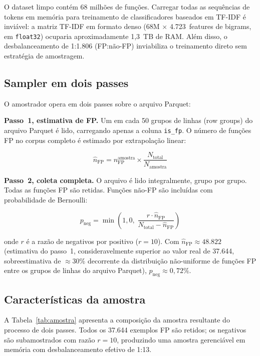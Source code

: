 O dataset limpo contém 68 milhões de funções. Carregar todas as sequências de
tokens em memória para treinamento de classificadores baseados em TF-IDF é
inviável: a matriz TF-IDF em formato denso (68M $\times$ 4.723~features de
bigrams, em \texttt{float32}) ocuparia aproximadamente 1,3~TB de RAM. Além disso, o
desbalanceamento de 1:1.806 (FP:não-FP) inviabiliza o treinamento direto sem
estratégia de amostragem.

\subsection{Sampler em dois passes}
\label{sub:sampler}

O amostrador opera em dois passes sobre o arquivo Parquet:

\textbf{Passo~1, estimativa de FP.} Um em cada 50 grupos de linhas (row
groups) do arquivo Parquet é lido, carregando apenas a coluna \texttt{is\_fp}. O
número de funções FP no corpus completo é estimado por extrapolação linear:

\begin{equation}
\hat{n}_{\text{FP}} = n_{\text{FP}}^{\text{amostra}} \times
\frac{N_{\text{total}}}{N_{\text{amostra}}}
\end{equation}

\textbf{Passo~2, coleta completa.} O arquivo é lido integralmente, grupo por
grupo. Todas as funções FP são retidas. Funções não-FP são incluídas com
probabilidade de Bernoulli:

\begin{equation}
p_{\text{neg}} = \min\!\left(1{,}0,\;
\frac{r \cdot \hat{n}_{\text{FP}}}{N_{\text{total}} - \hat{n}_{\text{FP}}}\right)
\end{equation}

onde $r$ é a razão de negativos por positivo ($r = 10$). Com
$\hat{n}_{\text{FP}} \approx 48.822$ (estimativa do passo~1, consideravelmente
superior ao valor real de 37.644, sobreestimativa de $\approx$30\% decorrente
da distribuição não-uniforme de funções FP entre os grupos de linhas do arquivo
Parquet), $p_{\text{neg}} \approx 0{,}72\%$.

\subsection{Características da amostra}
\label{sub:amostra-stats}

A Tabela~\ref{tab:amostra} apresenta a composição da amostra resultante do
processo de dois passes. Todos os 37.644 exemplos FP são retidos; os negativos são
subamostrados com razão $r = 10$, produzindo uma amostra gerenciável em memória
com desbalanceamento efetivo de 1:13.

